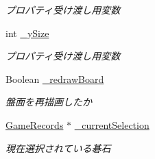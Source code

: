 \begin{DoxyCompactItemize}
\begin{DoxyCompactList}\small\item\em プロパティ受け渡し用変数 \end{DoxyCompactList}\item 
\hypertarget{interface_board_view_a56becca2fd671b02acf25bc838c20bbb}{
int \hyperlink{interface_board_view_a56becca2fd671b02acf25bc838c20bbb}{\_\-ySize}}
\label{interface_board_view_a56becca2fd671b02acf25bc838c20bbb}

\begin{DoxyCompactList}\small\item\em プロパティ受け渡し用変数 \end{DoxyCompactList}\item 
\hypertarget{interface_board_view_a190d16ef976d1b061da3d24ec25bad84}{
Boolean \hyperlink{interface_board_view_a190d16ef976d1b061da3d24ec25bad84}{\_\-redrawBoard}}
\label{interface_board_view_a190d16ef976d1b061da3d24ec25bad84}

\begin{DoxyCompactList}\small\item\em 盤面を再描画したか \end{DoxyCompactList}\item 
\hypertarget{interface_board_view_a67d40f51a96e539f814a361c35e63c30}{
\hyperlink{interface_game_records}{GameRecords} $\ast$ \hyperlink{interface_board_view_a67d40f51a96e539f814a361c35e63c30}{\_\-currentSelection}}
\label{interface_board_view_a67d40f51a96e539f814a361c35e63c30}

\begin{DoxyCompactList}\small\item\em 現在選択されている碁石 \end{DoxyCompactList}\end{DoxyCompactItemize}
